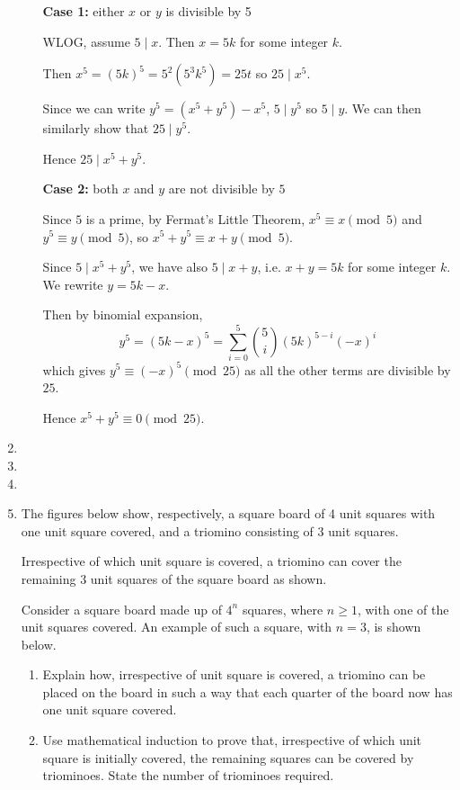 \begin{enumerate}
\begin{solution}
\begin{enumerate}[label=(\roman*)]
\textbf{Case 1:} either $x$ or $y$ is divisible by 5

WLOG, assume $5\mid x$. Then $x=5k$ for some integer $k$.

Then $x^5=(5k)^5=5^2(5^3k^5)=25t$ so $25\mid x^5$.

Since we can write $y^5=(x^5+y^5)-x^5$, $5\mid y^5$ so $5\mid y$. We can then similarly show that $25\mid y^5$.

Hence $25\mid x^5+y^5$.

\textbf{Case 2:} both $x$ and $y$ are not divisible by $5$

Since $5$ is a prime, by Fermat's Little Theorem, $x^5\equiv x\pmod 5$ and $y^5\equiv y\pmod 5$, so $x^5+y^5\equiv x+y\pmod 5$.

Since $5\mid x^5+y^5$, we have also $5\mid x+y$, i.e. $x+y=5k$ for some integer $k$. We rewrite $y=5k-x$.

Then by binomial expansion,
\[ y^5=(5k-x)^5=\sum_{i=0}^5\binom{5}{i}(5k)^{5-i}(-x)^i \]
which gives $y^5\equiv(-x)^5\pmod {25}$ as all the other terms are divisible by $25$.

Hence $x^5+y^5\equiv0\pmod {25}$.
\end{enumerate}
\end{solution}

\item 
\item 
\item 
\item The figures below show, respectively, a square board of 4 unit squares with one unit square covered, and a triomino consisting of 3 unit squares.

Irrespective of which unit square is covered, a triomino can cover the remaining 3 unit squares of the square board as shown.

Consider a square board made up of $4^n$ squares, where $n\ge1$, with one of the unit squares covered. An example of such a square, with $n=3$, is shown below.

\begin{enumerate}[label=(\roman*)]
\item Explain how, irrespective of unit square is covered, a triomino can be placed on the board in such a way that each quarter of the board now has one unit square covered.
\item Use mathematical induction to prove that, irrespective of which unit square is initially covered, the remaining squares can be covered by triominoes. State the number of triominoes required.
\end{enumerate}
\end{enumerate}

